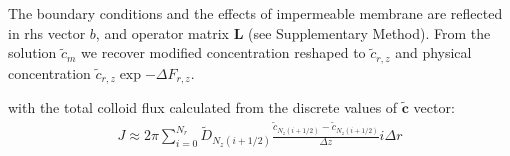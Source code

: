 \documentclass[12pt, a4paper]{article}
\begin{document}
The boundary conditions and the effects of impermeable membrane are reflected in rhs vector $b$, and operator matrix $\mathbf{L}$ (see Supplementary Method).
From the solution $\tilde{c}_m$ we recover modified concentration reshaped to $\tilde{c}_{r,z}$ and physical concentration $\tilde{c}_{r,z} \exp{-\Delta F_{r,z}}$.

with the total colloid flux calculated from the discrete values of $\tilde{\bm{c}}$ vector:
\begin{eqnarray}
    J \approx 2 \pi \sum_{i=0}^{N_r} \tilde{D}_{N_z(i+1/2)} \frac{\tilde{c}_{N_z(i+1/2)} - \tilde{c}_{N_z(i+1/2)}}{\Delta z} i \Delta r
\end{eqnarray}
\end{document}
